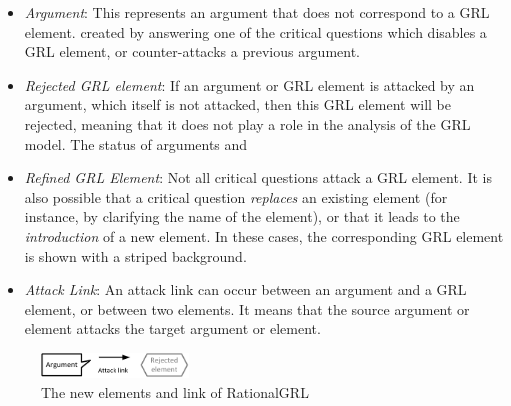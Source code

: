 \begin{itemize}
\item \emph{Argument}: This represents an argument that does not correspond to a GRL element. created by answering one of the critical questions which disables a GRL element, or counter-attacks a previous argument. 
\item \emph{Rejected GRL element}: If an argument or GRL element is attacked by an argument, which itself is not attacked, then this GRL element will be rejected, meaning that it does not play a role in the analysis of the GRL model. The status of arguments and 
\item \emph{Refined GRL Element}: Not all critical questions attack a GRL element. It is also possible that a critical question \emph{replaces} an existing element (for instance, by clarifying the name of the element), or that it leads to the \emph{introduction} of a new element. In these cases, the corresponding GRL element is shown with a striped background. 
\item \emph{Attack Link}: An attack link can occur between an argument and a GRL element, or between two elements. It means that the source argument or element attacks the target argument or element.
\end{itemize} 

\begin{figure}[h]
\centering
\includegraphics[width=0.35\textwidth]{img/legend}
\caption{The new elements and link of RationalGRL}
\label{fig:rationalgrllegend}
\end{figure}
\fi%

